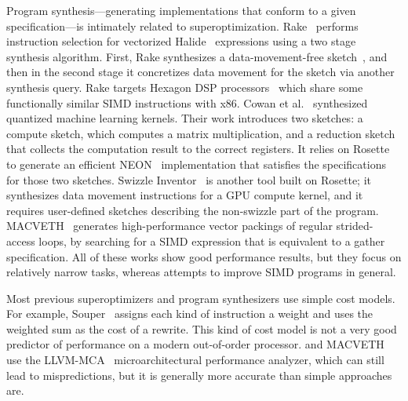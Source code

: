 Program synthesis---generating implementations that conform to
a given specification---is intimately related to superoptimization.
%
Rake~\cite{rake} performs instruction selection for vectorized
Halide~\cite{halide} expressions using a two stage synthesis
algorithm.
%
First, Rake synthesizes a data-movement-free sketch~\cite{sketch}, and
then in the second stage it concretizes data movement for the
sketch via another synthesis query.
%
Rake targets Hexagon DSP processors~\cite{hexagon} which share some functionally
similar SIMD instructions with x86\@.
%
Cowan et al.~\cite{ml_syn} synthesized quantized machine learning
kernels.
%
Their work introduces two sketches: a compute sketch, which computes a matrix
multiplication, and a reduction sketch that collects the computation
result to the correct registers.
%
It relies on Rosette~\cite{rosette} to generate an efficient NEON~\cite{neon}
implementation that satisfies the specifications for those two
sketches.
%
Swizzle Inventor~\cite{swizzleinventor} is another tool built on
Rosette; it synthesizes data movement instructions for a GPU compute
kernel, and it requires user-defined sketches describing the
non-swizzle part of the program.
%
MACVETH~\cite{sparse} generates high-performance vector packings of
regular strided-access loops, by searching for a SIMD expression that
is equivalent to a gather specification.
%
All of these works show good performance results, but they focus on
relatively narrow tasks, whereas \minotaur{} attempts to improve SIMD
programs in general.


Most previous superoptimizers and program synthesizers use simple
cost models.
%
For example, Souper~\cite{souper} assigns each kind of instruction a
weight and uses the weighted sum as the cost of a rewrite.
%
This kind of cost model is not a very good predictor of performance
on a modern out-of-order processor.
%
\minotaur{} and MACVETH~\cite{sparse} use the LLVM-MCA~\cite{llvmmca}
microarchitectural performance analyzer, which can still lead to
mispredictions, but it is generally more accurate than simple
approaches are.
